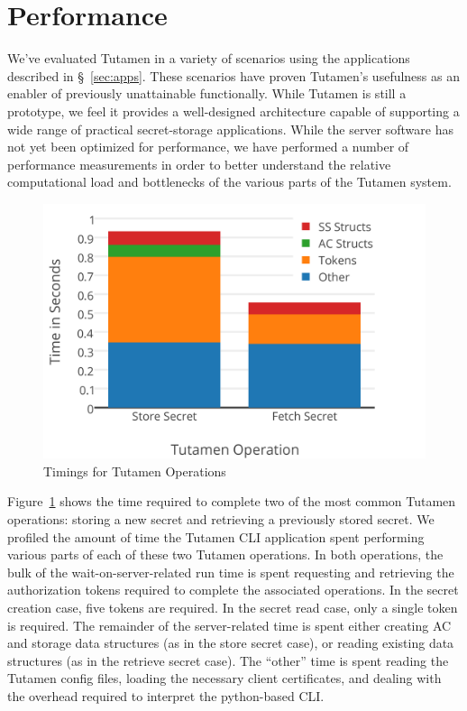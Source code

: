 \section{Performance}
\label{sec:performace}

We've evaluated Tutamen in a variety of scenarios using the
applications described in \S~\ref{sec:apps}. These scenarios have
proven Tutamen's usefulness as an enabler of previously unattainable
functionally. While Tutamen is still a prototype, we feel it provides
a well-designed architecture capable of supporting a wide range of
practical secret-storage applications. While the server software has
not yet been optimized for performance, we have performed a number of
performance measurements in order to better understand the relative
computational load and bottlenecks of the various parts of the Tutamen
system.

\begin{figure}[th]
  \centering
  \includegraphics[width=\columnwidth]{./figs/png/chart-timings.png}
  \caption{Timings for Tutamen Operations}
  \label{fig:eval:timings}
\end{figure}

Figure~\ref{fig:eval:timings} shows the time required to complete two
of the most common Tutamen operations: storing a new secret and
retrieving a previously stored secret. We profiled the amount of time
the Tutamen CLI application spent performing various parts of each of
these two Tutamen operations. In both operations, the bulk of the
wait-on-server-related run time is spent requesting and retrieving the
authorization tokens required to complete the associated
operations. In the secret creation case, five tokens are required. In
the secret read case, only a single token is required. The remainder of
the server-related time is spent either creating AC and storage data
structures (as in the store secret case), or reading existing data
structures (as in the retrieve secret case). The ``other'' time is
spent reading the Tutamen config files, loading the necessary client
certificates, and dealing with the overhead required to interpret the
python-based CLI.

